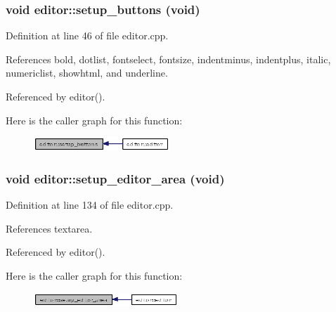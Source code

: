 \subsubsection{\setlength{\rightskip}{0pt plus 5cm}void editor::setup\_\-buttons (void)\hspace{0.3cm}{\tt  [private]}}\label{classeditor_f03caf9e95f6e6472095a90f1d287f00}




Definition at line 46 of file editor.cpp.

References bold, dotlist, fontselect, fontsize, indentminus, indentplus, italic, numericlist, showhtml, and underline.

Referenced by editor().

Here is the caller graph for this function:\begin{figure}[H]
\begin{center}
\leavevmode
\includegraphics[width=145pt]{classeditor_f03caf9e95f6e6472095a90f1d287f00_icgraph}
\end{center}
\end{figure}
\subsubsection{\setlength{\rightskip}{0pt plus 5cm}void editor::setup\_\-editor\_\-area (void)\hspace{0.3cm}{\tt  [private]}}\label{classeditor_f271b46f48848e7f103aa14a98101cd8}




Definition at line 134 of file editor.cpp.

References textarea.

Referenced by editor().

Here is the caller graph for this function:\begin{figure}[H]
\begin{center}
\leavevmode
\includegraphics[width=154pt]{classeditor_f271b46f48848e7f103aa14a98101cd8_icgraph}
\end{center}
\end{figure}
